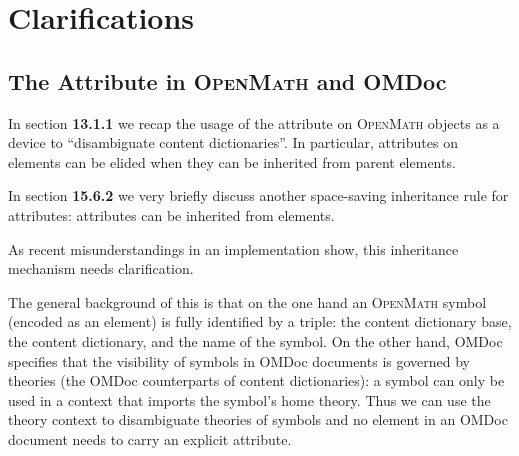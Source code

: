 \documentclass{article}
\def\omdoc{OMDoc}
\def\openmath{\scshape{OpenMath}}
\begin{document}
\section{Clarifications}

\subsection{The {} Attribute in {\openmath} and {\omdoc}}

In section {\textbf{13.1.1}} we recap the usage of the {} attribute
on {\openmath} objects as a device to ``disambiguate content dictionaries''. In
particular, {} attributes on {}
elements can be elided when they can be inherited from parent elements.

In section {\textbf{15.6.2}} we very briefly discuss another space-saving inheritance rule
for {} attributes: {}
attributes can be inherited from {} elements. 

As recent misunderstandings in an implementation show, this inheritance mechanism needs
clarification. 

The general background of this is that on the one hand an {\openmath} symbol (encoded as
an {} element) is fully identified by a triple: the content
dictionary base, the content dictionary, and the name of the symbol. On the other hand,
{\omdoc} specifies that the visibility of symbols in {\omdoc} documents is governed by
theories (the {\omdoc} counterparts of content dictionaries): a symbol can only be used in
a context that imports the symbol's home theory. Thus we can use the theory context to
disambiguate theories of symbols and no {} element in an {\omdoc}
document needs to carry an explicit {} attribute.
\end{document}
